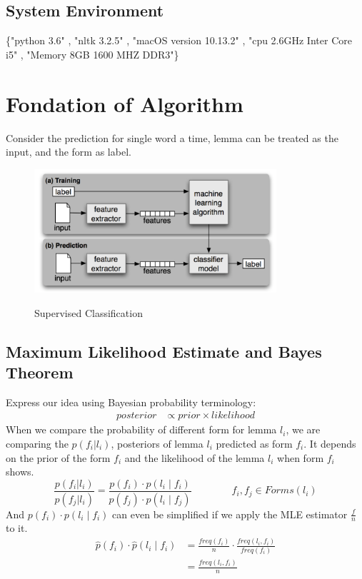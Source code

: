 \documentclass[a4paper]{article}
\begin{document}
\subsection{System Environment}
\{"python 3.6"
, "nltk 3.2.5"
, "macOS version 10.13.2"
, "cpu 2.6GHz Inter Core i5"
, "Memory 8GB 1600 MHZ DDR3"\}

\section{Fondation of Algorithm}
Consider the prediction for single word a time, lemma can be treated as the input, and the form as label. 
\begin{figure}[H]  
\centering
\includegraphics[width=0.8\textwidth]{process_flow.png}
\caption{Supervised Classification\protect\footnotemark}  
\cite{bird_natural_2009}
\end{figure}

\subsection{Maximum Likelihood Estimate and Bayes Theorem}
Express our idea using Bayesian probability terminology:
\begin{align*}
posterior  &\propto  prior \times likelihood
\end{align*}
When we compare the probability of different form for lemma $l_i$, we are comparing the $p(f_i|l_i)$, posteriors  of lemma $l_i$ predicted as form $f_i$. It depends on the prior of the form $f_i$ and the likelihood of the lemma $l_i$ when form $f_i$ shows.
\begin{equation}
\frac{p(f_i|l_i)}{p(f_j|l_i)} = \frac{p(f_i) \cdot p(l_i \mid f_i)}{  p(f_j) \cdot p(l_i \mid f_j) } \qquad \qquad  f_i,f_j \in Forms(l_i)
\end{equation}
And $p(f_i) \cdot p(l_i \mid f_i)$ can even be simplified if we apply the MLE estimator $\frac{f}{n}$ to it.
\begin{equation} 
\label{eq:simple_mle}
\begin{aligned}
\hat{p}(f_i) \cdot \hat{p}(l_i \mid f_i) &= \frac{freq(f_i)}{n} \cdot \frac{freq(l_i, f_i)}{freq(f_i)} \\
&= \frac{freq(l_i, f_i)}{n}
\end{aligned}
\end{equation}
\end{document}

